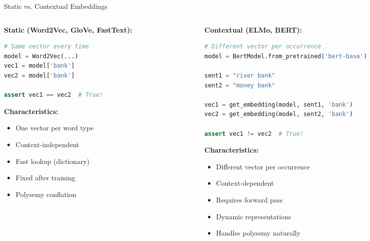 \documentclass[aspectratio=169]{beamer}
\begin{document}
\begin{frame}[fragile]{Static vs. Contextual Embeddings 🔄}
\begin{columns}[T]
\begin{column}{0.48\textwidth}
\textbf{Static (Word2Vec, GloVe, FastText):}

\vspace{0.5em}
\begin{lstlisting}[language=Python]
# Same vector every time
model = Word2Vec(...)
vec1 = model['bank']
vec2 = model['bank']

assert vec1 == vec2  # True!
\end{lstlisting}

\vspace{0.5em}
\textbf{Characteristics:}
\begin{itemize}\setlength{\itemsep}{0pt}
    \item One vector per word type
    \item Context-independent
    \item Fast lookup (dictionary)
    \item Fixed after training
    \item Polysemy conflation
\end{itemize}
\end{column}

\begin{column}{0.48\textwidth}
\textbf{Contextual (ELMo, BERT):}

\vspace{0.5em}
\begin{lstlisting}[language=Python]
# Different vector per occurrence
model = BertModel.from_pretrained('bert-base')

sent1 = "river bank"
sent2 = "money bank"

vec1 = get_embedding(model, sent1, 'bank')
vec2 = get_embedding(model, sent2, 'bank')

assert vec1 != vec2  # True!
\end{lstlisting}

\vspace{0.5em}
\textbf{Characteristics:}
\begin{itemize}\setlength{\itemsep}{0pt}
    \item Different vector per occurrence
    \item Context-dependent
    \item Requires forward pass
    \item Dynamic representations
    \item Handles polysemy naturally
\end{itemize}
\end{column}
\end{columns}
\end{frame}
\end{document}
